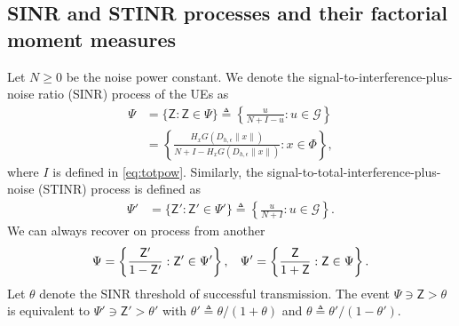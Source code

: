 \documentclass[lettersize,journal]{IEEEtran}
\begin{document}
\subsection{SINR and STINR processes and their factorial moment measures}
Let $N \geq 0$ be the noise power constant. We denote the signal-to-interference-plus-noise ratio (SINR) process of the UEs as
\begin{align}
  \label{eq:STIR}
  \Psi &= \{\mathsf{Z}: \mathsf{Z} \in \Psi\} \triangleq \left\{ \frac{u}{N+I-u} : u \in \mathcal{G}\right\} \\
  &=\left\{ \frac{H_x G(D_{h,\epsilon}\|x\|)}{N+I-H_x G(D_{h,\epsilon}\|x\|)} : x \in \Phi\right\},
\end{align}
where $I$ is defined in \eqref{eq:totpow}. Similarly, the signal-to-total-interference-plus-noise (STINR) process is defined as
\begin{align}
  \label{eq:STINR}
  \Psi' &= \{\mathsf{Z}': \mathsf{Z}' \in \Psi'\} \triangleq \left\{ \frac{u}{N+I} : u \in \mathcal{G}\right\}.
\end{align}
We can always recover on process from another
\begin{equation}
  \Psi = \left\{ \frac{\mathsf{Z}'}{1- \mathsf{Z}'}: \mathsf{Z}' \in \Psi' \right\}, \hspace{0.3cm} \Psi' = \left\{ \frac{\mathsf{Z}}{1+ \mathsf{Z}}: \mathsf{Z} \in \Psi \right\}.
\end{equation}
Let $\theta$ denote the SINR threshold of successful transmission. The event $\Psi \ni\mathsf{Z}> \theta$ is equivalent to $\Psi' \ni \mathsf{Z}'> \theta'$  with $\theta' \triangleq \theta/(1+\theta)$ and $\theta \triangleq \theta'/(1-\theta')$.
\end{document}
